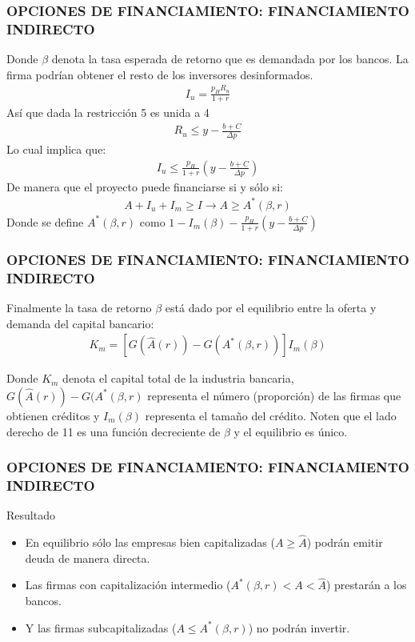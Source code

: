 \begin{frame}
    \frametitle{{\normalsize OPCIONES DE FINANCIAMIENTO: FINANCIAMIENTO INDIRECTO} {}}
       Donde $\beta$ denota la tasa esperada de retorno que es demandada por los bancos. La firma podrían obtener el resto de los inversores desinformados.
    \begin{align}
    I_{u}=\frac{p_{H}R_{u}}{1+r}
    \end{align}
    Así que dada la restricción 5 es unida a 4
     \begin{align}
     R_{u}\leq y-\frac{b+C}{\Delta p}
     \end{align}
    Lo cual implica que:
    \begin{align}
    I_{u}\leq\frac{p_{H}}{1+r}(y-\frac{b+C}{\Delta p})
    \end{align}
    De manera que el proyecto puede financiarse si y sólo si:
    \begin{align}
    A+I_{u}+I_{m}\geq I\rightarrow A\geq A^{*}(\beta, r)
    \end{align}
   Donde se define $A^{*}(\beta, r)$ como $1-I_{m}(\beta)-\frac{p_{H}}{1+r}(y-\frac{b+C}{\Delta p})$
   
\end{frame}

\begin{frame}
    \frametitle{{\normalsize OPCIONES DE FINANCIAMIENTO: FINANCIAMIENTO INDIRECTO} {}}
    Finalmente la tasa de retorno $\beta$ está dado por el equilibrio entre la oferta y demanda del capital bancario:
    \begin{align}
    K_{m}=\left[G(\hat{A}(r))-G(A^{*}(\beta, r)) \right] I_{m}(\beta)
    \end{align}
    
    Donde $K_{m}$ denota el capital total de la industria bancaria, $G(\hat{A}(r))-G(A^{*}(\beta, r)$ representa el número (proporción) de las firmas que obtienen créditos y $I_{m}(\beta)$ representa el tamaño del crédito. Noten que el lado derecho de 11 es una función decreciente de $\beta$ y el equilibrio es único. 
\end{frame}

\begin{frame}
    \frametitle{{\normalsize OPCIONES DE FINANCIAMIENTO: FINANCIAMIENTO INDIRECTO} {}}
    \begin{block} {Resultado}
        \begin{itemize}
            \item  En equilibrio sólo las empresas bien capitalizadas ($A\geq \hat{A} $) podrán emitir deuda de manera directa.
            \item  Las firmas con capitalización intermedio ($A^{*}(\beta, r) < A < \hat{A} $) prestarán a los bancos.
            \item Y las firmas subcapitalizadas ($ A \leq A^{*}(\beta, r) $)  no podrán invertir.
        \end{itemize}
      \end{block}
  
\end{frame}

